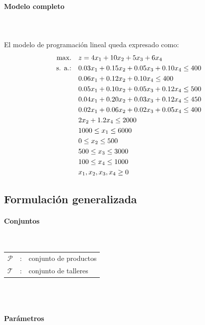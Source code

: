 \paragraph{Modelo completo}\mbox{}\\
\\
El modelo de programación lineal queda expresado como:
\begin{align}
\mbox{max.} \quad & z = 4x_1 + 10x_2 + 5x_3 + 6x_4 \notag \\
\mbox{s. a.:} \quad & 0.03x_1 + 0.15x_2 + 0.05x_3 + 0.10x_4 \leq 400 \notag \\
& 0.06x_1 + 0.12x_2 + 0.10x_4 \leq 400 \notag \\
& 0.05x_1 + 0.10x_2 + 0.05x_3 + 0.12x_4 \leq 500 \notag \\
& 0.04x_1 + 0.20x_2 + 0.03x_3 + 0.12x_4 \leq 450 \notag \\
& 0.02x_1 + 0.06x_2 + 0.02x_3 + 0.05x_4 \leq 400 \notag \\
& 2x_2 + 1.2x_4 \leq 2000 \notag \\
& 1000 \leq x_1 \leq 6000 \notag \\
& 0 \leq x_2 \leq 500 \notag \\
& 500 \leq x_3 \leq 3000 \notag \\
& 100 \leq x_4 \leq 1000 \notag \\
& x_1, x_2, x_3, x_4 \geq 0 \notag
\end{align}


\subsection{Formulación generalizada}

\paragraph{Conjuntos}\mbox{}\\

\begin{tabular}{l c l}
    $\mathcal{P}$  & : & conjunto de productos \\
    $\mathcal{T}$  & : & conjunto de talleres \\
\end{tabular}
\\
\\

\paragraph{Parámetros}\mbox{}\\


